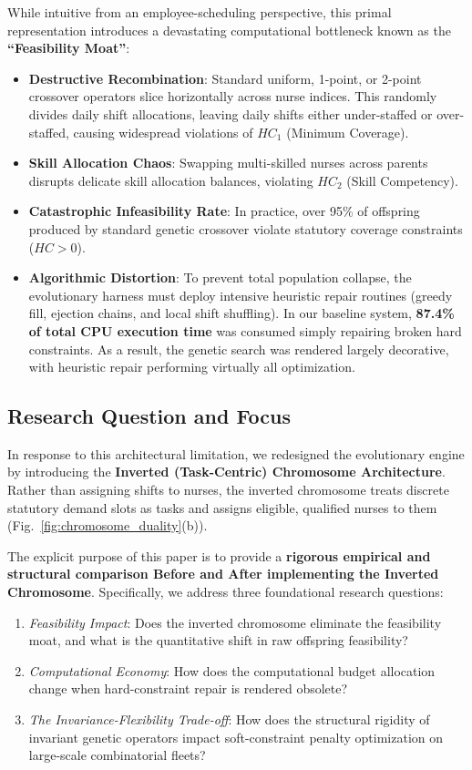 \documentclass[10pt,journal,compsoc]{IEEEtran}
\begin{document}
While intuitive from an employee-scheduling perspective, this primal representation introduces a devastating computational bottleneck known as the \textbf{``Feasibility Moat''}:
\begin{itemize}
    \item \textbf{Destructive Recombination}: Standard uniform, 1-point, or 2-point crossover operators slice horizontally across nurse indices. This randomly divides daily shift allocations, leaving daily shifts either under-staffed or over-staffed, causing widespread violations of $HC_1$ (Minimum Coverage).
    \item \textbf{Skill Allocation Chaos}: Swapping multi-skilled nurses across parents disrupts delicate skill allocation balances, violating $HC_2$ (Skill Competency).
    \item \textbf{Catastrophic Infeasibility Rate}: In practice, over 95\% of offspring produced by standard genetic crossover violate statutory coverage constraints ($HC > 0$).
    \item \textbf{Algorithmic Distortion}: To prevent total population collapse, the evolutionary harness must deploy intensive heuristic repair routines (greedy fill, ejection chains, and local shift shuffling). In our baseline system, \textbf{87.4\% of total CPU execution time} was consumed simply repairing broken hard constraints. As a result, the genetic search was rendered largely decorative, with heuristic repair performing virtually all optimization.
\end{itemize}

\subsection{Research Question and Focus}
In response to this architectural limitation, we redesigned the evolutionary engine by introducing the \textbf{Inverted (Task-Centric) Chromosome Architecture}. Rather than assigning shifts to nurses, the inverted chromosome treats discrete statutory demand slots as tasks and assigns eligible, qualified nurses to them (Fig.~\ref{fig:chromosome_duality}(b)).

The explicit purpose of this paper is to provide a \textbf{rigorous empirical and structural comparison Before and After implementing the Inverted Chromosome}. Specifically, we address three foundational research questions:
\begin{enumerate}
    \item \textit{Feasibility Impact}: Does the inverted chromosome eliminate the feasibility moat, and what is the quantitative shift in raw offspring feasibility?
    \item \textit{Computational Economy}: How does the computational budget allocation change when hard-constraint repair is rendered obsolete?
    \item \textit{The Invariance-Flexibility Trade-off}: How does the structural rigidity of invariant genetic operators impact soft-constraint penalty optimization on large-scale combinatorial fleets?
\end{enumerate}
\end{document}
